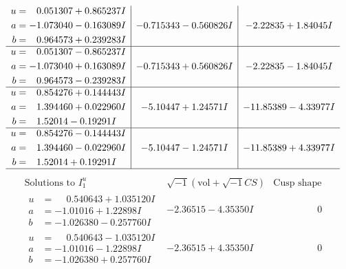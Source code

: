 \documentclass[1p]{elsarticle_modified}
\theoremstyle{definition}
\newcommand{\I}{\sqrt{-1}}
\begin{document}
$$\begin{array}{c|c|c}
\begin{aligned}
u &= \phantom{-}0.051307 + 0.865237 I \\
a &= -1.073040 - 0.163089 I \\
b &= \phantom{-}0.964573 + 0.239283 I\end{aligned}
 & -0.715343 - 0.560826 I & -2.22835 + 1.84045 I \\ \hline\begin{aligned}
u &= \phantom{-}0.051307 - 0.865237 I \\
a &= -1.073040 + 0.163089 I \\
b &= \phantom{-}0.964573 - 0.239283 I\end{aligned}
 & -0.715343 + 0.560826 I & -2.22835 - 1.84045 I \\ \hline\begin{aligned}
u &= \phantom{-}0.854276 + 0.144443 I \\
a &= \phantom{-}1.394460 + 0.022960 I \\
b &= \phantom{-}1.52014 - 0.19291 I\end{aligned}
 & -5.10447 + 1.24571 I & -11.85389 - 4.33977 I \\ \hline\begin{aligned}
u &= \phantom{-}0.854276 - 0.144443 I \\
a &= \phantom{-}1.394460 - 0.022960 I \\
b &= \phantom{-}1.52014 + 0.19291 I\end{aligned}
 & -5.10447 - 1.24571 I & -11.85389 + 4.33977 I\\
 \hline 
 \end{array}$$\newpage$$\begin{array}{c|c|c}  
\text{Solutions to }I^u_{1}& \I (\text{vol} + \sqrt{-1}CS) & \text{Cusp shape}\\
 \hline 
\begin{aligned}
u &= \phantom{-}0.540643 + 1.035120 I \\
a &= -1.01016 + 1.22898 I \\
b &= -1.026380 - 0.257760 I\end{aligned}
 & -2.36515 - 4.35350 I & \phantom{-0.000000 } 0 \\ \hline\begin{aligned}
u &= \phantom{-}0.540643 - 1.035120 I \\
a &= -1.01016 - 1.22898 I \\
b &= -1.026380 + 0.257760 I\end{aligned}
 & -2.36515 + 4.35350 I & \phantom{-0.000000 } 0 \\ \hline\begin{aligned}

\end{aligned}
\end{array}$$
\end{document}
